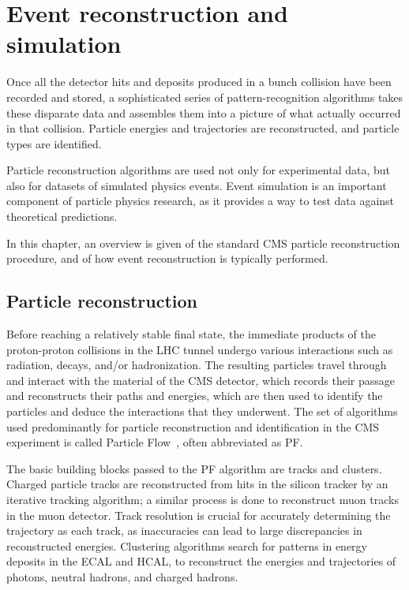 \chapter{Event reconstruction and simulation\label{sec:recosim}}

Once all the detector hits and deposits produced in a bunch collision have been recorded and stored, a sophisticated series of pattern-recognition algorithms takes these disparate data and assembles them into a picture of what actually occurred in that collision. Particle energies and trajectories are reconstructed, and particle types are identified.

Particle reconstruction algorithms are used not only for experimental data, but also for datasets of simulated physics events. Event simulation is an important component of particle physics research, as it provides a way to test data against theoretical predictions.

In this chapter, an overview is given of the standard CMS particle reconstruction procedure, and of how event reconstruction is typically performed.

\section{Particle reconstruction\label{sec:cms-reco}}
Before reaching a relatively stable final state, the immediate products of the proton-proton collisions in the LHC tunnel undergo various interactions such as radiation, decays, and/or hadronization. The resulting particles travel through and interact with the material of the CMS detector, which records their passage and reconstructs their paths and energies, which are then used to identify the particles and deduce the interactions that they underwent. The set of algorithms used predominantly for particle reconstruction and identification in the CMS experiment is called Particle Flow~\cite{CMS-PAS-PFT-09-001}, often abbreviated as PF.

The basic building blocks passed to the PF algorithm are tracks and clusters. Charged particle tracks are reconstructed from hits in the silicon tracker by an iterative tracking algorithm; a similar process is done to reconstruct muon tracks in the muon detector. Track resolution is crucial for accurately determining the trajectory as each track, as inaccuracies can lead to large discrepancies in reconstructed energies. Clustering algorithms search for patterns in energy deposits in the ECAL and HCAL, to reconstruct the energies and trajectories of photons, neutral hadrons, and charged hadrons.

